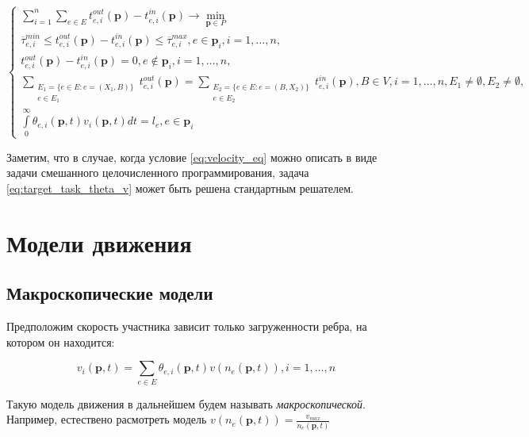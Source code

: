 \documentclass[12pt, a4paper]{article}
\DeclareMathOperator*{\minn}{min}
\begin{document}
\begin{equation}
\label{eq:target_task_theta_v}
\begin{cases}
	\sum \limits_{i = 1}^n \sum \limits_{e \in E} t_{e, i}^{out}(\textbf{p}) - t_{e, i}^{in}(\textbf{p}) \rightarrow \minn \limits _{\textbf{p} \in P}
	\\
	\overline{\tau}_{e, i}^{min} \le t_{e, i}^{out}(\textbf{p}) - t_{e, i}^{in}(\textbf{p}) \le \overline{\tau}_{e, i}^{max}, e \in \textbf{p}_i, i = 1, \dots, n,
	\\
	t_{e, i}^{out}(\textbf{p}) - t_{e, i}^{in}(\textbf{p}) = 0, e \notin \textbf{p}_i, i = 1, \dots, n,
	\\
	\sum \limits_{ \substack{E_1 = \{ e \in E: e = (X_1, B) \} \\ e \in E_1}} t_{e, i}^{out} (\textbf{p}) = \sum \limits_{ \substack{E_2 = \{ e \in E: e = (B, X_2) \} \\ e \in E_2}} t_{e, i}^{in} (\textbf{p}), B \in V, i = 1, \dots, n, E_1 \ne \emptyset, E_2 \ne \emptyset,
	\\
	\int\limits_{0}^{\infty} \theta_{e, i} (\textbf{p}, t) v_i(\textbf{p}, t) dt = l_e, e \in \textbf{p}_i
\end{cases}
\end{equation}

Заметим, что в случае, когда условие \eqref{eq:velocity_eq} можно описать в виде задачи смешанного целочисленного программирования, 
задача \eqref{eq:target_task_theta_v} может быть решена стандартным решателем.

\newpage
\section{Модели движения}

\subsection{Макроскопические модели}

Предположим скорость участника зависит только загруженности ребра, на котором он находится:

\begin{equation}
	\label{eq:velocity_eq_macro}
	 v_i(\textbf{p}, t) = \sum \limits _{e \in E} \theta_{e, i} (\textbf{p}, t) v (n_e (\textbf{p}, t)),  i = 1, \dots, n
\end{equation}

Такую модель движения в дальнейшем будем называть \textit{макроскопической}.
Например, естествено расмотреть модель $ v (n_e (\textbf{p}, t)) = \frac{v_{max}}{n_e (\textbf{p}, t)}$
\end{document}
